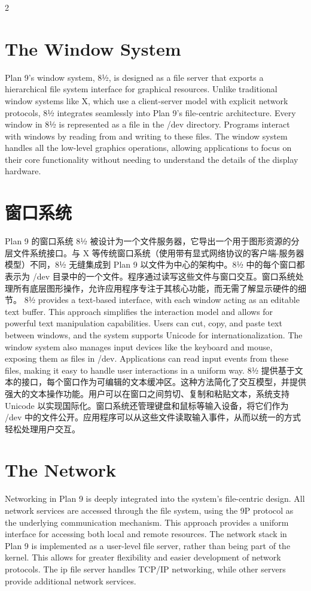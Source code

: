 \documentclass{article}
\begin{document}
\begin{paracol}{2}
\section*{The Window System}
Plan 9's window system, 8½, is designed as a file server that exports a hierarchical file system interface for graphical resources. Unlike traditional window systems like X, which use a client-server model with explicit network protocols, 8½ integrates seamlessly into Plan 9's file-centric architecture. Every window in 8½ is represented as a file in the /dev directory. Programs interact with windows by reading from and writing to these files. The window system handles all the low-level graphics operations, allowing applications to focus on their core functionality without needing to understand the details of the display hardware.
\switchcolumn
\section*{窗口系统}
Plan 9 的窗口系统 8½ 被设计为一个文件服务器，它导出一个用于图形资源的分层文件系统接口。与 X 等传统窗口系统（使用带有显式网络协议的客户端-服务器模型）不同，8½ 无缝集成到 Plan 9 以文件为中心的架构中。8½ 中的每个窗口都表示为 /dev 目录中的一个文件。程序通过读写这些文件与窗口交互。窗口系统处理所有底层图形操作，允许应用程序专注于其核心功能，而无需了解显示硬件的细节。
\switchcolumn*
8½ provides a text-based interface, with each window acting as an editable text buffer. This approach simplifies the interaction model and allows for powerful text manipulation capabilities. Users can cut, copy, and paste text between windows, and the system supports Unicode for internationalization. The window system also manages input devices like the keyboard and mouse, exposing them as files in /dev. Applications can read input events from these files, making it easy to handle user interactions in a uniform way.
\switchcolumn
8½ 提供基于文本的接口，每个窗口作为可编辑的文本缓冲区。这种方法简化了交互模型，并提供强大的文本操作功能。用户可以在窗口之间剪切、复制和粘贴文本，系统支持 Unicode 以实现国际化。窗口系统还管理键盘和鼠标等输入设备，将它们作为 /dev 中的文件公开。应用程序可以从这些文件读取输入事件，从而以统一的方式轻松处理用户交互。
\switchcolumn*
\section*{The Network}
Networking in Plan 9 is deeply integrated into the system's file-centric design. All network services are accessed through the file system, using the 9P protocol as the underlying communication mechanism. This approach provides a uniform interface for accessing both local and remote resources. The network stack in Plan 9 is implemented as a user-level file server, rather than being part of the kernel. This allows for greater flexibility and easier development of network protocols. The ip file server handles TCP/IP networking, while other servers provide additional network services.
\switchcolumn

\end{paracol}
\end{document}
